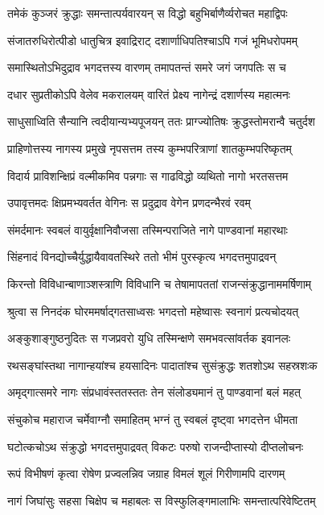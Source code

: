 \twolineshloka
{तमेकं कुञ्जरं क्रुद्धाः समन्तात्पर्यवारयन्}
{स विद्धो बहुभिर्बाणैर्व्यरोचत महाद्विपः}


\twolineshloka
{संजातरुधिरोत्पीडो धातुचित्र इवाद्रिराट्}
{दशार्णाधिपतिश्चाऽपि गजं भूमिधरोपमम्}


\twolineshloka
{समास्थितोऽभिदुद्राव भगदत्तस्य वारणम्}
{तमापतन्तं समरे जगं जगपतिः स च}


\twolineshloka
{दधार सुप्रतीकोऽपि वेलेव मकरालयम्}
{वारितं प्रेक्ष्य नागेन्द्रं दशार्णस्य महात्मनः}


\twolineshloka
{साधुसाध्विति सैन्यानि त्वदीयान्यभ्यपूजयन्}
{ततः प्राग्ज्योतिषः क्रुद्धस्तोमरान्वै चतुर्दश}


\twolineshloka
{प्राहिणोत्तस्य नागस्य प्रमुखे नृपसत्तम}
{तस्य कुम्भपरित्राणां शातकुम्भपरिष्कृतम्}


\twolineshloka
{विदार्य प्राविशन्क्षिप्रं वल्मीकमिव पन्नगाः}
{स गाढविद्धो व्यथितो नागो भरतसत्तम}


\twolineshloka
{उपावृत्तमदः क्षिप्रमभ्यवर्तत वेगिनः}
{स प्रदुद्राव वेगेन प्रणदन्भैरवं रवम्}


\twolineshloka
{संमर्दमानः स्वबलं वायुर्वृक्षानिवौजसा}
{तस्मिन्पराजिते नागे पाण्डवानां महारथाः}


\twolineshloka
{सिंहनादं विनद्योच्चैर्युद्धायैवावतस्थिरे}
{ततो भीमं पुरस्कृत्य भगदत्तमुपाद्रवन्}


\twolineshloka
{किरन्तो विविधान्बाणाञ्शस्त्राणि विविधानि च}
{तेषामापततां राजन्संक्रुद्धानाममर्षिणाम्}


\twolineshloka
{श्रुत्वा स निनदंक घोरममर्षाद्गतसाध्वसः}
{भगदत्तो महेष्वासः स्वनागं प्रत्यचोदयत्}


\twolineshloka
{अङ्कुशाङ्गुष्ठनुदितः स गजप्रवरो युधि}
{तस्मिन्क्षणे समभवत्सांवर्तक इवानलः}


\twolineshloka
{रथसङ्घांस्तथा नागान्हयांश्च हयसादिनः}
{पादातांश्च सुसंक्रुद्धः शतशोऽथ सहस्रशःक}


\twolineshloka
{अमृद्गात्समरे नागः संप्रधावंस्ततस्ततः}
{तेन संलोड्यमानं तु पाण्डवानां बलं महत्}


\twolineshloka
{संचुकोच महाराज चर्मेवाग्नौ समाहितम्}
{भग्नं तु स्वबलं दृष्ट्वा भगदत्तेन धीमता}


\twolineshloka
{घटोत्कचोऽथ संक्रुद्धो भगदत्तमुपाद्रवत्}
{विकटः परुषो राजन्दीप्तास्यो दीप्तलोचनः}


\twolineshloka
{रूपं विभीषणं कृत्वा रोषेण प्रज्वलन्निव}
{जग्राह विमलं शूलं गिरीणामपि दारणम्}


\twolineshloka
{नागं जिघांसुः सहसा चिक्षेप च महाबलः}
{स विस्फुलिङ्गमालाभिः समन्तात्परिवेष्टितम्}


